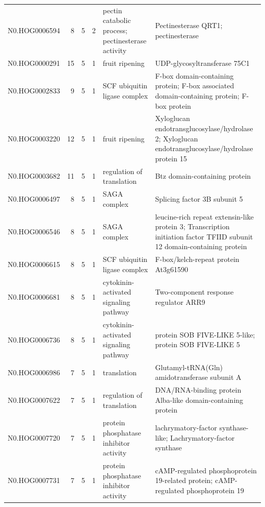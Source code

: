 \begin{table}
\begin{tabular}[t]{lrrrll}
N0.HOG0006594 & 8 & 5 & 2 & pectin catabolic process; pectinesterase activity & Pectinesterase QRT1; pectinesterase\\
N0.HOG0000291 & 15 & 5 & 1 & fruit ripening & UDP-glycosyltransferase 75C1\\
N0.HOG0002833 & 9 & 5 & 1 & SCF ubiquitin ligase complex & F-box domain-containing protein; F-box associated domain-containing protein; F-box protein\\
N0.HOG0003220 & 12 & 5 & 1 & fruit ripening & Xyloglucan endotransglucosylase/hydrolase 2; Xyloglucan endotransglucosylase/hydrolase protein 15\\
N0.HOG0003682 & 11 & 5 & 1 & regulation of translation & Btz domain-containing protein\\
N0.HOG0006497 & 8 & 5 & 1 & SAGA complex & Splicing factor 3B subunit 5\\
N0.HOG0006546 & 8 & 5 & 1 & SAGA complex & leucine-rich repeat extensin-like protein 3; Transcription initiation factor TFIID subunit 12 domain-containing protein\\
N0.HOG0006615 & 8 & 5 & 1 & SCF ubiquitin ligase complex & F-box/kelch-repeat protein At3g61590\\
N0.HOG0006681 & 8 & 5 & 1 & cytokinin-activated signaling pathway & Two-component response regulator ARR9\\
N0.HOG0006736 & 8 & 5 & 1 & cytokinin-activated signaling pathway & protein SOB FIVE-LIKE 5-like; protein SOB FIVE-LIKE 5\\
N0.HOG0006986 & 7 & 5 & 1 & translation & Glutamyl-tRNA(Gln) amidotransferase subunit A\\
N0.HOG0007622 & 7 & 5 & 1 & regulation of translation & DNA/RNA-binding protein Alba-like domain-containing protein\\
N0.HOG0007720 & 7 & 5 & 1 & protein phosphatase inhibitor activity & lachrymatory-factor synthase-like; Lachrymatory-factor synthase\\
N0.HOG0007731 & 7 & 5 & 1 & protein phosphatase inhibitor activity & cAMP-regulated phosphoprotein 19-related protein; cAMP-regulated phosphoprotein 19\\
\bottomrule
\end{tabular}
\end{table}
